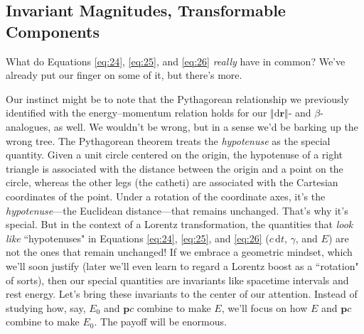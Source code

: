 \documentclass[12pt]{article}
\renewcommand{\vv}[1]{\mathbf{#1}}
\newcommand{\dd}[1]{\mathrm{d}#1}
\begin{document}
%
%


\subsection{Invariant Magnitudes, Transformable Components}

What do Equations \ref{eq:24}, \ref{eq:25}, and \ref{eq:26} \emph{really} have in common? We've already put our finger on some of it, but there's more.

Our instinct might be to note that the Pythagorean relationship we previously identified with the energy--momentum relation holds for our $\Vert \dd \vv r \Vert$- and $\beta$-analogues, as well. We wouldn't be wrong, but in a sense we'd be barking up the wrong tree. The Pythagorean theorem treats the \emph{hypotenuse} as the special quantity. Given a unit circle centered on the origin, the hypotenuse of a right triangle is associated with the distance between the origin and a point on the circle, whereas the other legs (the catheti) are associated with the Cartesian coordinates of the point. Under a rotation of the coordinate axes, it's the \emph{hypotenuse}---the Euclidean distance---that remains unchanged. That's why it's special. But in the context of a Lorentz transformation, the quantities that \emph{look like} ``hypotenuses" in Equations \ref{eq:24}, \ref{eq:25}, and \ref{eq:26} ($c \, \dd t$, $\gamma$, and $E$) are not the ones that remain unchanged! If we embrace a geometric mindset, which we'll soon justify (later we'll even learn to regard a Lorentz boost as a ``rotation" of sorts), then our special quantities are invariants like spacetime intervals and rest energy. Let's bring these invariants to the center of our attention. Instead of studying how, say, $E_0$ and $\vv p c$ combine to make $E$, we'll focus on how $E$ and $\vv p c$ combine to make $E_0$. The payoff will be enormous.
\end{document}
